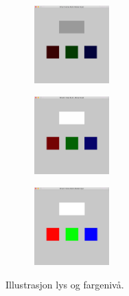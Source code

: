 \begin{figure}[h]
\centering
\begin{subfigure}{0.23\textwidth}
\includegraphics[width=3cm, height=3cm]{fig/color-1}
\caption{}
\label{fig:color-1}
\end{subfigure}
\begin{subfigure}{0.23\textwidth}
\includegraphics[width=3cm, height=3cm]{fig/color-2}
\caption{}
\label{fig:color-2}
\end{subfigure}
\begin{subfigure}{0.23\textwidth}
\includegraphics[width=3cm, height=3cm]{fig/color-3}
\caption{}
\label{fig:color-3}
\end{subfigure}
\caption{Illustrasjon lys og fargenivå.}
\label{fig:color}
\end{figure}

